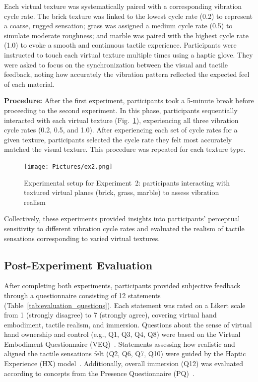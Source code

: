 Each virtual texture was systematically paired with a corresponding vibration cycle rate. The brick texture was linked to the lowest cycle rate (0.2) to represent a coarse, rugged sensation; grass was assigned a medium cycle rate (0.5) to simulate moderate roughness; and marble was paired with the highest cycle rate (1.0) to evoke a smooth and continuous tactile experience. Participants were instructed to touch each virtual texture multiple times using a haptic glove. They were asked to focus on the synchronization between the visual and tactile feedback, noting how accurately the vibration pattern reflected the expected feel of each material.

\textbf{Procedure:} After the first experiment, participants took a 5-minute break before proceeding to the second experiment. In this phase, participants sequentially interacted with each virtual texture (Fig.~\ref{fig:experiment2_setup}), experiencing all three vibration cycle rates (0.2, 0.5, and 1.0). After experiencing each set of cycle rates for a given texture, participants selected the cycle rate they felt most accurately matched the visual texture. This procedure was repeated for each texture type.

\begin{figure}[H]\centering
	\texttt{[image: Pictures/ex2.png]}%
	\caption{Experimental setup for Experiment~2: participants interacting with textured virtual planes (brick, grass, marble) to assess vibration realism}\label{fig:experiment2_setup}
\end{figure}

Collectively, these experiments provided insights into participants' perceptual sensitivity to different vibration cycle rates and evaluated the realism of tactile sensations corresponding to varied virtual textures.

\newpage
\subsection{Post-Experiment Evaluation}
After completing both experiments, participants provided subjective feedback through a questionnaire consisting of 12 statements (Table~\ref{tab:evaluation_questions}). Each statement was rated on a Likert scale from 1 (strongly disagree) to 7 (strongly agree), covering virtual hand embodiment, tactile realism, and immersion. Questions about the sense of virtual hand ownership and control (e.g., Q1, Q3, Q4, Q8) were based on the Virtual Embodiment Questionnaire (VEQ)~\cite{10.1145/3027063.3053272}. Statements assessing how realistic and aligned the tactile sensations felt (Q2, Q6, Q7, Q10) were guided by the Haptic Experience (HX) model~\cite{10.1016/j.ijhcs.2017.04.004}. Additionally, overall immersion (Q12) was evaluated according to concepts from the Presence Questionnaire (PQ)~\cite{10.1162/105474698565686}.

